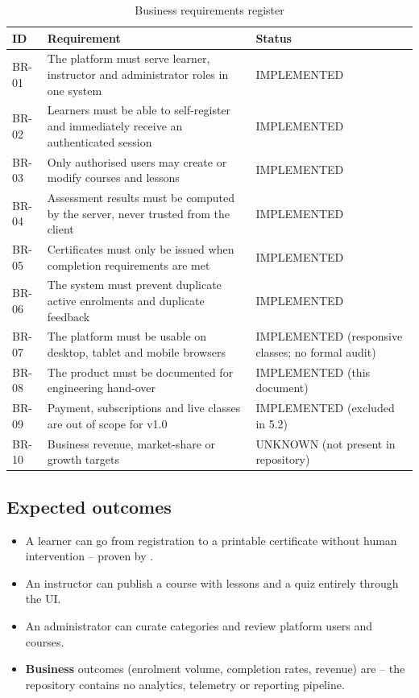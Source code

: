 \begin{table}[H]
\centering
\caption{Business requirements register}
\label{tab:brd-requirements}
\begin{tabular}{@{}C{1.4cm}L{9.0cm}C{3.6cm}@{}}
\toprule
\textbf{ID} & \textbf{Requirement} & \textbf{Status} \\
\midrule
BR-01 & The platform must serve learner, instructor and administrator roles in one system & IMPLEMENTED \\
BR-02 & Learners must be able to self-register and immediately receive an authenticated session & IMPLEMENTED \\
BR-03 & Only authorised users may create or modify courses and lessons & IMPLEMENTED \\
BR-04 & Assessment results must be computed by the server, never trusted from the client & IMPLEMENTED \\
BR-05 & Certificates must only be issued when completion requirements are met & IMPLEMENTED \\
BR-06 & The system must prevent duplicate active enrolments and duplicate feedback & IMPLEMENTED \\
BR-07 & The platform must be usable on desktop, tablet and mobile browsers & IMPLEMENTED (responsive classes; no formal audit) \\
BR-08 & The product must be documented for engineering hand-over & IMPLEMENTED (this document) \\
BR-09 & Payment, subscriptions and live classes are out of scope for v1.0 & IMPLEMENTED (excluded in  5.2) \\
BR-10 & Business revenue, market-share or growth targets & UNKNOWN (not present in repository) \\
\bottomrule
\end{tabular}
\end{table}

\subsection{Expected outcomes}

\begin{itemize}
    \item A learner can go from registration to a printable certificate without human intervention -- proven by .
    \item An instructor can publish a course with lessons and a quiz entirely through the UI.
    \item An administrator can curate categories and review platform users and courses.
    \item \textbf{Business} outcomes (enrolment volume, completion rates, revenue) are  -- the repository contains no analytics, telemetry or reporting pipeline.
\end{itemize}

